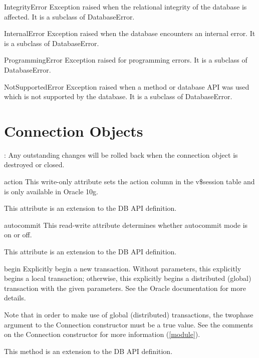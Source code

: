 \documentclass{manual}
\begin{document}
\begin{datadesc}{IntegrityError}
  Exception raised when the relational integrity of the database is affected.
  It is a subclass of DatabaseError.
\end{datadesc}
 
\begin{datadesc}{InternalError}
  Exception raised when the database encounters an internal error.
  It is a subclass of DatabaseError.
\end{datadesc}
 
\begin{datadesc}{ProgrammingError}
  Exception raised for programming errors. It is a subclass of DatabaseError.
\end{datadesc}
 
\begin{datadesc}{NotSupportedError}
  Exception raised when a method or database API was used which is not
  supported by the database. It is a subclass of DatabaseError.
\end{datadesc}
 
\chapter{Connection Objects\label{connobj}}

: Any outstanding changes will be rolled back when the connection
object is destroyed or closed.

\begin{datadesc}{action}
  This write-only attribute sets the action column in the v\$session table and
  is only available in Oracle 10g.

   This attribute is an extension to the DB API definition.
\end{datadesc}

\begin{datadesc}{autocommit}
  This read-write attribute determines whether autocommit mode is on or off.

   This attribute is an extension to the DB API definition.
\end{datadesc}

\begin{funcdesc}{begin}{}
  Explicitly begin a new transaction. Without parameters, this explicitly
  begins a local transaction; otherwise, this explicitly begins a distributed
  (global) transaction with the given parameters. See the Oracle documentation
  for more details.

  Note that in order to make use of global (distributed) transactions, the
  twophase argument to the Connection constructor must be a true value. See the
  comments on the Connection constructor for more information (\ref{module}).

   This method is an extension to the DB API definition.
\end{funcdesc}
\end{document}
